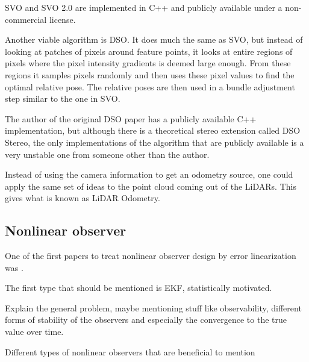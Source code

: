 \gls{SVO} and \gls{SVO} 2.0 are implemented in C++ and publicly available under a non-commercial license. 

Another viable algorithm is \gls{DSO}\cite{DSO}. It does much the same as \gls{SVO}, but instead of looking at patches of pixels around feature points, it looks at entire regions of pixels where the pixel intensity gradients is deemed large enough. From these regions it samples pixels randomly and then uses these pixel values to find the optimal relative pose. The relative poses are then used in a bundle adjustment step similar to the one in SVO.

The author of the original \gls{DSO} paper has a publicly available C++ implementation, but although there is a theoretical stereo extension called \gls{DSO} Stereo\cite{DSOStereo}, the only implementations of the algorithm that are publicly available is a very unstable one from someone other than the author. 

Instead of using the camera information to get an odometry source, one could apply the same set of ideas to the point cloud coming out of the \glspl{LiDAR}. This gives what is known as \gls{LiDAR} Odometry. 

\subsection{Nonlinear observer}
\iffalse
One of the first papers to treat nonlinear observer design by error linearization was \cite{FirstErrorLinNonlinObs}. 

The first type that should be mentioned is EKF, statistically motivated. 

Explain the general problem, maybe mentioning stuff like observability, different forms of stability of the observers and especially the convergence to the true value over time. 

Different types of nonlinear observers that are beneficial to mention

